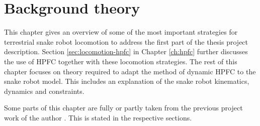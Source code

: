 \chapter{Background theory}\label{chapter:theory}

This chapter gives an overview of some of the most important strategies for terrestrial snake robot locomotion to address the first part of the thesis project description. Section \ref{sec:locomotion-hpfc} in Chapter \ref{ch:hpfc} further discusses the use of HPFC together with these locomotion strategies. The rest of this chapter focuses on theory required to adapt the method of dynamic HPFC to the snake robot model. This includes an explanation of the snake robot kinematics, dynamics and constraints.


Some parts of this chapter are fully or partly taken from the previous project work of the author \cite{AtussaProsjektoppgp}. This is stated in the respective sections.








%







